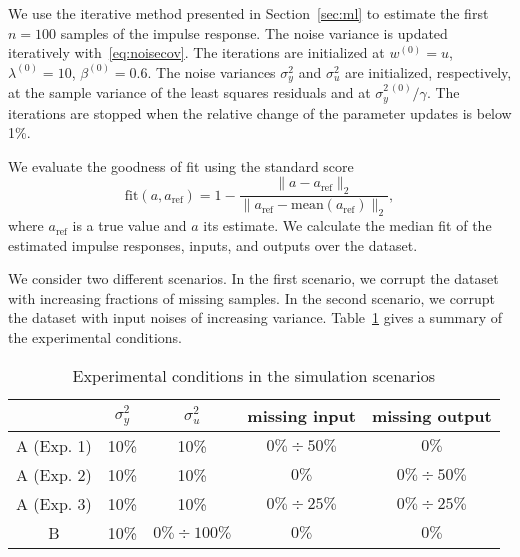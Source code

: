 \documentclass[10pt]{article}
\begin{document}
We use the iterative method presented in Section~\ref{sec:ml} to estimate the
first $n=100$ samples of the impulse response. The noise variance is updated
iteratively with~\eqref{eq:noisecov}. The iterations are initialized at
$w^{(0)}=u$, $\lambda^{(0)}=10$, $\beta^{(0)}=0.6$. The noise variances
$\sigma_y^2$ and $\sigma_u^2$ are initialized, respectively, at the sample
variance
of the least squares residuals and at $\sigma_y^{2\,(0)}/\gamma$. The iterations
are stopped when the relative change of the parameter updates is below 1\%.

We evaluate the goodness of fit using the standard score
\begin{equation}
  \mathrm{fit}(a, a_\mathrm{ref}) = 1- \frac{\| a -
  a_\mathrm{ref}\|_2}{\|a_\mathrm{ref} - \mathrm{mean}(a_\mathrm{ref})\|_2},
\end{equation}
where $a_\mathrm{ref}$ is a true value and $a$ its estimate. We calculate
the median fit of the estimated impulse responses, inputs, and outputs over the
dataset.

We consider two different scenarios. In the first scenario, we corrupt the
dataset with increasing fractions of missing samples. In the second scenario, we
corrupt the dataset with input noises of increasing variance.
Table~\ref{tab:summary} gives a summary of the experimental conditions.

\begin{table}[b]
  \centering
  \begin{tabular}{ccccc}
    \toprule
    & $\sigma_y^2$ & $\sigma_u^2$ & missing input  & missing output\\
    \midrule
    A (Exp. 1) & 10\% & 10\% &  $0\%\div50\%$ & $0\%$\\
    A (Exp. 2) & 10\% & 10\% & $0\%$ & $0\%\div50\%$ \\
    A (Exp. 3) & 10\% & 10\% & $0\%\div25\%$ & $0\%\div25\%$\\
    B & 10\% & $0\%\div100\%$ & $0\%$ & $0\%$\\
    \bottomrule
  \end{tabular}
  \caption{Experimental conditions in the simulation scenarios}\label{tab:summary}
\end{table}
\end{document}
